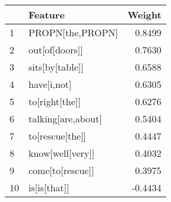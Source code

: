 \begin{tabular}{llr}
\toprule
{} &             Feature &  Weight \\
\midrule
1  &    PROPN[the,PROPN] &  0.8499 \\
2  &      out[of[doors]] &  0.7630 \\
3  &     sits[by[table]] &  0.6588 \\
4  &         have[i,not] &  0.6305 \\
5  &      to[right[the]] &  0.6276 \\
6  &  talking[are,about] &  0.5404 \\
7  &     to[rescue[the]] &  0.4447 \\
8  &    know[well[very]] &  0.4032 \\
9  &    come[to[rescue]] &  0.3975 \\
10 &        is[is[that]] & -0.4434 \\
\bottomrule
\end{tabular}
